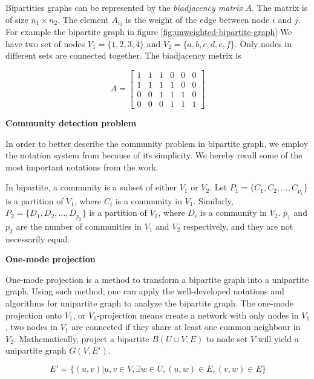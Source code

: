 Bipartities graphs can be represented by the \textit{biadjacency matrix} $A$.
The matrix is of size $n_1 \times n_2$.
The element $A_{ij}$ is the weight of the edge between node $i$ and $j$.
For example the bipartite graph in figure \ref{fig:unweighted-bipartite-graph}
We have two set of nodes $V_1 = \{1, 2, 3, 4\}$ and $V_2 = \{a, b, c, d, e, f\}$.
Only nodes in different sets are connected together.
The biadjacency metrix is

\begin{equation*}
	A =
	\begin{bmatrix}
		1 & 1 & 1 & 0 & 0 & 0 \\
		1 & 1 & 1 & 1 & 0 & 0 \\
		0 & 0 & 1 & 1 & 1 & 0 \\
		0 & 0 & 0 & 1 & 1 & 1
	\end{bmatrix}
\end{equation*}

\textbf{Community detection problem}

In order to better describe the community problem in bipartite graph,
we employ the notation system from \cite{pesantez2018} because of its simplicity.
We hereby recall some of the most important notations from the work.

In bipartite, a community is a subset of either $V_1$ or $V_2$.
Let $P_1 = \{C_1, C_2, \ldots, C_{p_1}\}$ is a partition of $V_1$,
where $C_i$ is a community in $V_1$.
Similarly, $P_2 = \{D_1, D_2, \ldots, D_{p_2}\}$ is a partition of $V_2$,
where $D_i$ is a community in $V_2$.
$p_1$ and $p_2$ are the number of communities in $V_1$ and $V_2$ respectively,
and they are not necessarily equal.


\textbf{One-mode projection}

One-mode projection is a method to transform a bipartite graph into a unipartite graph.
Using such method, one can apply the well-developed notations and algorithms for unipartite graph to analyze the bipartite graph.
The one-mode projection onto $V_1$, or $V_1$-projection means create a network with only nodes in $V_1$,
two nodes in $V_1$ are connected if they share at least one common neighbour in $V_2$.
Mathematically, project a bipartite $B(U\cup V, E)$ to node set $V$
will yield a unipartite graph $G(V, E')$.

\begin{equation*}
	E' = \{(u, v) | u, v \in V, \exists w \in U, (u, w) \in E, (v, w) \in E\}
\end{equation*}

